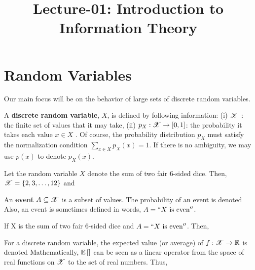 \documentclass[letterpaper,10pt,english]{article}
\title{Lecture-01: Introduction to Information Theory}
\author{}
\begin{document}
\maketitle

\section{Random Variables} 

Our main focus will be on the behavior of large sets of discrete random variables. 
\begin{defn} 
A \textbf{discrete random variable}, $X$, is defined by following information: 
(i) $\mathscr{X}$ : the finite set of values that it may take, 
(ii) $p_X : \mathscr{X} \to [0, 1]$: the probability it takes each value $x \in X$ . 
Of course, the probability distribution $p_X$ must satisfy the normalization condition $\sum_{x \in X}p_X (x) = 1$. 
If there is no ambiguity, we may use $p(x)$ to denote $p_X (x)$. 
\end{defn}
\begin{exmp}
Let the random variable $X$ denote the sum of two fair 6-sided dice. 
Then, $\mathscr{X} = \left\{2, 3, \dots, 12\right\}$ and 
\end{exmp}
\begin{defn}
An \textbf{event} $A \subseteq \mathscr{X}$ is a subset of values. 
The probability of an event is denoted 
Also, an event is sometimes defined in words, $A = ``X \text{ is even}''$.
\end{defn}
\begin{exmp} 
If X is the sum of two fair 6-sided dice and $A = ``X \text{ is even}''$. Then, 
\end{exmp}
\begin{defn} 
For a discrete random variable, the expected value (or average) of $f : \mathscr{X} \to \mathbb{R}$ is denoted
Mathematically, $\mathbb{E}\left[\right]$ can be seen as a linear operator from the space of real functions on $\mathscr{X}$ to the set of real numbers. 
Thus,
\end{defn}
\end{document}
